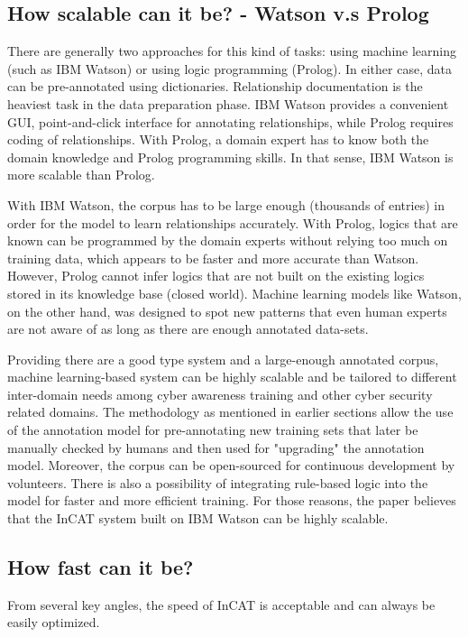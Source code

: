 \documentclass[conference]{IEEEtran}
\begin{document}
\subsection{How scalable can it be? - Watson v.s Prolog}
There are generally two approaches for this kind of tasks: using machine learning (such as IBM Watson) or using logic programming (Prolog). In either case, data can be pre-annotated using dictionaries. Relationship documentation is the heaviest task in the data preparation phase. IBM Watson provides a convenient GUI, point-and-click interface for annotating relationships, while Prolog requires coding of relationships. With Prolog, a domain expert has to know both the domain knowledge and Prolog programming skills. In that sense, IBM Watson is more scalable than Prolog.

With IBM Watson, the corpus has to be large enough (thousands of entries) in order for the model to learn relationships accurately. With Prolog, logics that are known can be programmed by the domain experts without relying too much on training data, which appears to be faster and more accurate than Watson. However, Prolog cannot infer logics that are not built on the existing logics stored in its knowledge base (closed world). Machine learning models like Watson, on the other hand, was designed to spot new patterns that even human experts are not aware of as long as there are enough annotated data-sets.

Providing there are a good type system and a large-enough annotated corpus, machine learning-based system can be highly scalable and be tailored to different inter-domain needs among cyber awareness training and other cyber security related domains. The methodology as mentioned in earlier sections allow the use of the annotation model for pre-annotating new training sets that later be manually checked by humans and then used for "upgrading" the annotation model. Moreover, the corpus can be open-sourced for continuous development by volunteers. There is also a possibility of integrating rule-based logic into the model for faster and more efficient training. For those reasons, the paper believes that the InCAT system built on IBM Watson can be highly scalable.

\subsection{How fast can it be?}

From several key angles, the speed of InCAT is acceptable and can always be easily optimized.
\end{document}
